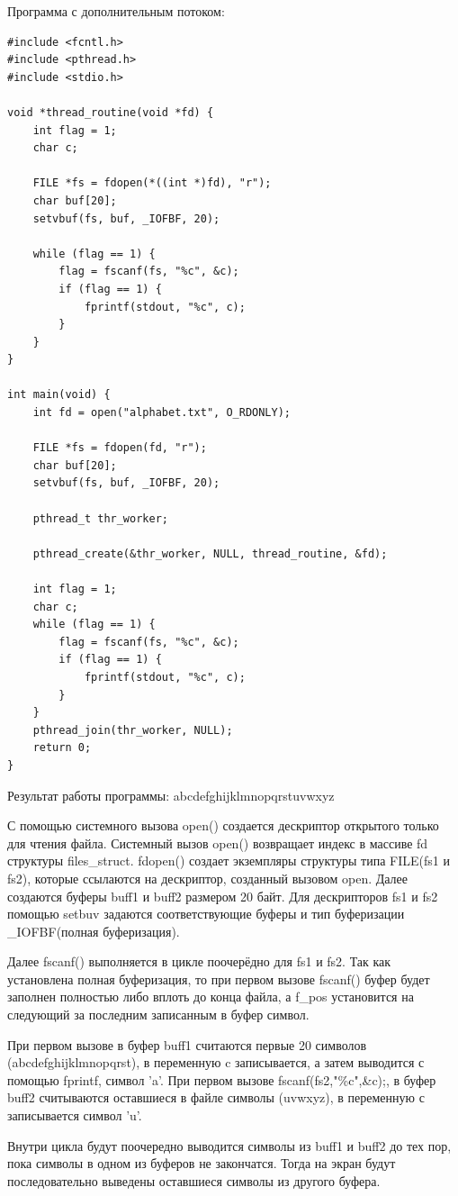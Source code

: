 \clearpage
Программа с дополнительным потоком:
\begin{lstlisting}
#include <fcntl.h>
#include <pthread.h>
#include <stdio.h>

void *thread_routine(void *fd) {
	int flag = 1;
	char c;
	
	FILE *fs = fdopen(*((int *)fd), "r");
	char buf[20];
	setvbuf(fs, buf, _IOFBF, 20);
	
	while (flag == 1) {
		flag = fscanf(fs, "%c", &c);
		if (flag == 1) {
			fprintf(stdout, "%c", c);
		}
	}
}

int main(void) {
	int fd = open("alphabet.txt", O_RDONLY);
	
	FILE *fs = fdopen(fd, "r");
	char buf[20];
	setvbuf(fs, buf, _IOFBF, 20);
	
	pthread_t thr_worker;
	
	pthread_create(&thr_worker, NULL, thread_routine, &fd);
	
	int flag = 1;
	char c;
	while (flag == 1) {
		flag = fscanf(fs, "%c", &c);
		if (flag == 1) {
			fprintf(stdout, "%c", c);
		}
	}
	pthread_join(thr_worker, NULL);
	return 0;
}
\end{lstlisting}

Результат работы программы:\newline
abcdefghijklmnopqrstuvwxyz

С помощью системного вызова open() создается дескриптор открытого только для
чтения файла. Системный вызов open() возвращает индекс в массиве fd структуры
files\_struct. fdopen() создает экземпляры структуры типа FILE(fs1 и fs2),
которые ссылаются на дескриптор, созданный вызовом open.
Далее создаются буферы	buff1 и buff2 размером 20 байт. Для дескрипторов fs1 и
fs2 помощью setbuv задаются соответствующие буферы и тип буферизации
\_IOFBF(полная буферизация).

Далее fscanf() выполняется в цикле поочерёдно для fs1 и  fs2. Так как
установлена полная буферизация, то при первом вызове fscanf() буфер будет
заполнен полностью либо вплоть до конца файла, а f\_pos установится на
следующий за последним записанным в буфер символ.

При первом вызове  в буфер buff1 считаются первые 20
символов (abcdefghijklmnopqrst), в переменную c записывается, а затем выводится
с помощью fprintf, символ 'a'. При первом вызове fscanf(fs2,"\%c",\&c);, в
буфер buff2 считываются оставшиеся в файле символы (uvwxyz), в переменную с
записывается символ 'u'.

Внутри цикла будут поочередно выводится символы из buff1 и buff2 до тех пор,
пока символы в одном из буферов не закончатся. Тогда на экран будут
последовательно выведены оставшиеся символы из другого буфера.

